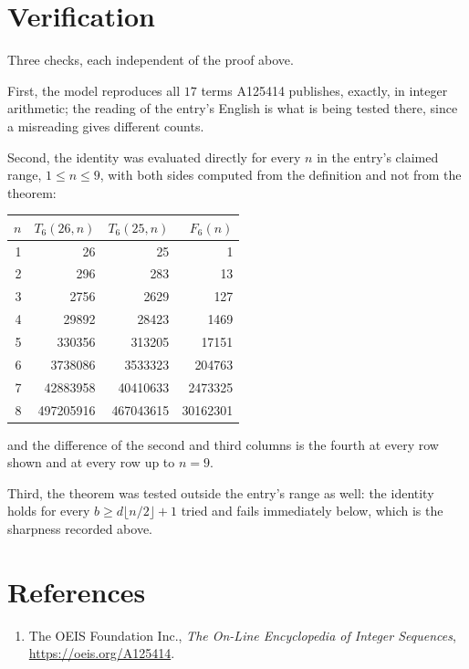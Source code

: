\documentclass[11pt,a4paper]{article}
\theoremstyle{plain}
\theoremstyle{definition}
\begin{document}
\section{Verification}

Three checks, each independent of the proof above.

First, the model reproduces all $17$ terms A125414 publishes, exactly, in integer
arithmetic; the reading of the entry's English is what is being tested there, since a
misreading gives different counts.

Second, the identity was evaluated directly for every $n$ in the entry's claimed range,
$1\le n\le9$, with both sides computed from the definition and not from the theorem:

\begin{center}
\begin{tabular}{rrrr}
$n$ & $T_{6}(26,n)$ & $T_{6}(25,n)$ & $F_{6}(n)$ \\ \hline
1 & 26 & 25 & 1 \\
2 & 296 & 283 & 13 \\
3 & 2756 & 2629 & 127 \\
4 & 29892 & 28423 & 1469 \\
5 & 330356 & 313205 & 17151 \\
6 & 3738086 & 3533323 & 204763 \\
7 & 42883958 & 40410633 & 2473325 \\
8 & 497205916 & 467043615 & 30162301 \\
\end{tabular}
\end{center}

\noindent and the difference of the second and third columns is the fourth at every row shown
and at every row up to $n=9$.

Third, the theorem was tested outside the entry's range as well: the identity holds for every
$b\ge d\lfloor n/2\rfloor+1$ tried and fails immediately below, which is the sharpness recorded
above.

\section*{References}
\begin{enumerate}
\item The OEIS Foundation Inc., \emph{The On-Line Encyclopedia of Integer Sequences},
\url{https://oeis.org/A125414}.
\end{enumerate}
\end{document}

